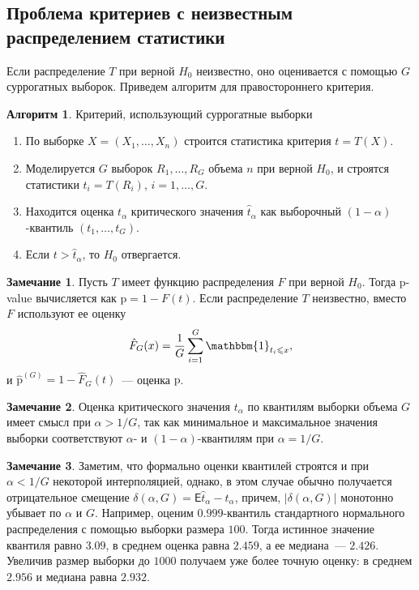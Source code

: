 \documentclass[specialist,
substylefile = spbu.rtx,
               subf,href,colorlinks=true,12pt]{disser}
\theoremstyle{definition}
\newtheorem{algorithm}{Алгоритм}
\newtheorem{remark}{Замечание}
\begin{document}
\subsection{Проблема критериев с неизвестным распределением статистики}\label{sect:problem}
Если распределение $T$ при верной $H_0$ неизвестно, оно оценивается с помощью $G$ суррогатных выборок. Приведем алгоритм для правостороннего критерия.

\begin{algorithm}{Критерий, использующий суррогатные выборки}\label{alg:surrogate}
	\begin{enumerate}
		\item По выборке $X=(X_1,\ldots, X_n)$ строится статистика критерия $t=T(X)$.
		\item Моделируется $G$ выборок $R_1,\ldots, R_G$ объема $n$ при верной $H_0$, и строятся статистики $t_i=T(R_i)$, $i=1,\ldots, G$.
		\item Находится оценка $t_\alpha$ критического значения $\hat t_\alpha$ как выборочный $(1-\alpha)$-квантиль $(t_1,\ldots,t_G)$.
		\item Если $t>\hat t_\alpha$, то $H_0$ отвергается.
	\end{enumerate}
\end{algorithm}

\begin{remark}
	Пусть $T$ имеет функцию распределения $F$ при верной $H_0$. Тогда p-value вычисляется как $\mathrm p= 1-F(t)$. Если распределение $T$ неизвестно, вместо $F$ используют ее оценку
	\[
		\hat F_G(x)=\frac{1}G\sum_{i=1}^G \mathbbm{1}_{t_i\leqslant x},
	\]
	и $\hat {\mathrm p}^{(G)} = 1 - \hat F_G(t)$~--- оценка $\mathrm p$.
\end{remark}

\begin{remark}\label{rem:assumption1}
	Оценка критического значения $t_\alpha$ по квантилям выборки объема $G$ имеет смысл при $\alpha>1/G$, так как минимальное и максимальное значения выборки соответствуют $\alpha$- и $(1-\alpha)$-квантилям при $\alpha = 1/G$.
\end{remark}

\begin{remark}
Заметим, что формально оценки квантилей строятся и при $\alpha < 1/G$ некоторой интерполяцией, однако, в этом случае обычно получается отрицательное смещение $\delta(\alpha,G)=\mathsf E\hat t_\alpha - t_\alpha$, причем, $|\delta(\alpha, G)|$ монотонно убывает по $\alpha$ и $G$.
	Например, оценим $0.999$-квантиль стандартного нормального распределения с помощью выборки размера $100$. Тогда истинное значение квантиля равно $3.09$, в среднем оценка равна $2.459$, а ее медиана~--- $2.426$. Увеличив размер выборки до $1000$ получаем уже более точную оценку: в среднем $2.956$ и медиана равна $2.932$.
\end{remark}
\end{document}
